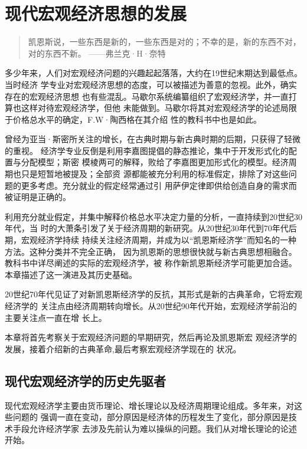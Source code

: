 \chapter{现代宏观经济思想的发展}

\begin{quotation}
  凯恩斯说，一些东西是新的，一些东西是对的；不幸的是，新的东西不对，对的东西不新。
  \raggedleft ——弗兰克·H·奈特
\end{quotation}

多少年来，人们对宏观经济问题的兴趣起起落落，大约在19世纪末期达到最低点。当时经济
学专业对宏观经济思想的态度，可以被描述为善意的忽视。此外，确实存在的宏观经济思想
也有些混乱。马歇尔系统编纂组织了宏观经济学，并一直打算也这样对待宏观经济学，但他
未能做到。马歇尔将其对宏观经济学的论述局限于价格总水平的确定，F.W·陶西格在其介绍
性的教科书中也是如此。

曾经为亚当·斯密所关注的增长，在古典时期与新古典时期的后期，只获得了轻微的重视。
经济学专业反倒是利用李嘉图提倡的静态推论，集中于开发形式化的配置与分配模型；斯密
模棱两可的解释，败给了李嘉图更加形式化的模型。经济周期也只是短暂地被提及；全部资
源都能被充分利用的标准假定，排除了对这些问题的更多考虑。充分就业的假定经常通过引
用萨伊定律即供给创造自身的需求而被证明是正确的。

利用充分就业假定，并集中解释价格总水平决定力量的分析，一直持续到20世纪30年代，当
时的大萧条引发了关于经济周期的新研究。从20世纪30年代到70年代后期，宏观经济学持续
持续关注经济周期，并成为以“凯恩斯经济学”而知名的一种方法。这种分类并不完全正确，
因为凯恩斯的思想很快就与新古典思想相融合。教科书中详尽阐述的实际的宏观经济学，被
称作新凯恩斯经济学可能更加合适。本章描述了这一演进及其历史基础。

20世纪70年代见证了对新凯恩斯经济学的反抗，其形式是新的古典革命，它将宏观经济学的
关注点由经济周期转向增长。从20世纪90年代开始，宏观经济学前沿的主要关注点一直在增
长上。

本章将首先考察关于宏观经济问题的早期研究，然后再论及凯恩斯宏
观经济学的发展，接着介绍新的古典革命,最后考察宏观经济学现在的
状况。

\section{现代宏观经济学的历史先驱者}

现代宏观经济学主要由货币理论、增长理论以及经济周期理论组成。多年来，对这些问题的
强调一直在变动，部分原因是经济体的历程发生了变化，部分原因是技术手段允许经济学家
去涉及先前认为难以操纵的问题。我们从对增长理论的论述开始。


